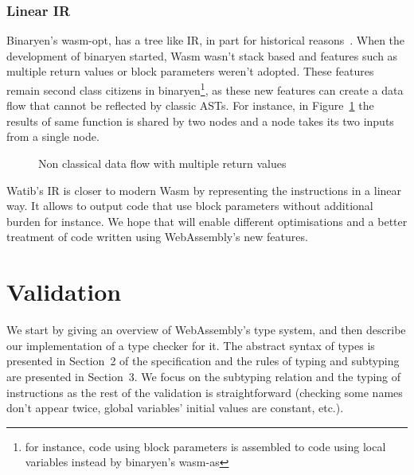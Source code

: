 \documentclass[a4paper,11pt]{article}
\begin{document}
\subsubsection{Linear IR}
Binaryen's \textsf{wasm-opt}, has a tree like IR, in part for historical
reasons~\cite{BinaryenIR}. When the development of binaryen started, Wasm wasn't
stack based and features such as multiple return values or block parameters
weren't adopted. These features remain second class citizens in
binaryen\footnote{for instance, code using block parameters is assembled to code
using local variables instead by binaryen's \textsf{wasm-as}}, as these new
features can create a data flow that cannot be reflected by classic ASTs. For
instance, in Figure~\ref{data-flow} the results of same function is shared by
two nodes and a node takes its two inputs from a single node.

\begin{figure}[h]
  \centering
  \caption{Non classical data flow with multiple return values}\label{data-flow}
\end{figure}

\textsf{Watib}'s IR is closer to modern Wasm by representing the instructions in
a linear way. It allows to output code that use block parameters without
additional burden for instance. We hope that will enable different optimisations
and a better treatment of code written using WebAssembly's new features.

\section{Validation}\label{val}
We start by giving an overview of WebAssembly's type system, and then describe
our implementation of a type checker for it. The abstract syntax of types is
presented in Section~2 of the specification and the rules of typing and
subtyping are presented in Section~3. We focus on the subtyping relation and the
typing of instructions as the rest of the validation is straightforward
(checking some names don't appear twice, global variables' initial values are
constant, etc.).
\end{document}
